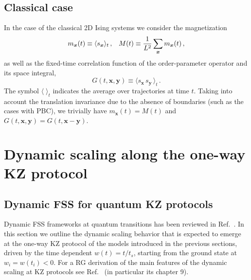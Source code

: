 \subsection{Classical case}
\label{clobs}

In the case of the classical 2D Ising systems we consider
the magnetization
  \begin{equation}
    m_{\bm x}(t) \equiv \langle s_{\bm x} \rangle_t\,,
      \;\;\; M(t) \equiv {1\over L^2} \sum_{\bm x} m_{\bm x}(t)\,,
  \label{magnt2d}
\end{equation}
as well as the fixed-time correlation function of the order-parameter
operator and its space integral,
\begin{equation}
  G(t,{\bm x},{\bm y}) \equiv \langle s_{\bm x}\, s_{\bm y}\,
  \rangle_t \,.
  \label{twopointtcl}
\end{equation}
The symbol $\langle \; \rangle_t$ indicates the average over
trajectories at time $t$.  Taking into account the translation
invariance due to the absence of boundaries (such as the cases with
PBC), we trivially have $m_{\bm x}(t) = M(t)$ and $G(t,{\bm x},{\bm
  y}) = G(t,{\bm x}-{\bm y})$.




\section{Dynamic scaling along the one-way KZ protocol}
\label{fssKZoneway}

\subsection{Dynamic FSS for quantum KZ protocols}
\label{qfssoneway}

Dynamic FSS frameworks at quantum transitions has been reviewed in
Ref.~\cite{RV-21}.  In this section we outline the dynamic scaling
behavior that is expected to emerge at the one-way KZ protocol of the
models introduced in the previous sections, driven by the time
dependent $w(t)=t/t_s$, starting from the ground state at
$w_i=w(t_i)<0$. For a RG derivation of the main features of the
dynamic scaling at KZ protocols see Ref.~\cite{RV-21} (in particular
its chapter 9).

